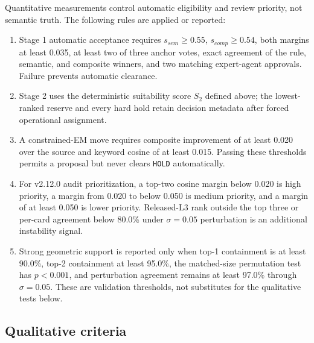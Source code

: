 \documentclass[11pt,a4paper]{article}
\newcommand{\code}[1]{\texttt{#1}}
\begin{document}
Quantitative measurements control automatic eligibility and review priority,
not semantic truth. The following rules are applied or reported:
\begin{enumerate}[leftmargin=2em]
  \item Stage 1 automatic acceptance requires $s_{sem}\geq0.55$,
  $s_{comp}\geq0.54$, both margins at least 0.035, at least two of three anchor
  votes, exact agreement of the rule, semantic, and composite winners, and two
  matching expert-agent approvals. Failure prevents automatic clearance.
  \item Stage 2 uses the deterministic suitability score $S_2$ defined above;
  the lowest-ranked reserve and every hard hold retain decision metadata after
  forced operational assignment.
  \item A constrained-EM move requires composite improvement of at least 0.020
  over the source and keyword cosine of at least 0.015. Passing these thresholds
  permits a proposal but never clears \code{HOLD} automatically.
  \item For v2.12.0 audit prioritization, a top-two cosine margin below 0.020 is
  high priority, a margin from 0.020 to below 0.050 is medium priority, and a
  margin of at least 0.050 is lower priority. Released-L3 rank outside the top
  three or per-card agreement below 80.0\% under $\sigma=0.05$ perturbation is
  an additional instability signal.
  \item Strong geometric support is reported only when top-1 containment is at
  least 90.0\%, top-2 containment at least 95.0\%, the matched-size permutation
  test has $p<0.001$, and perturbation agreement remains at least 97.0\% through
  $\sigma=0.05$. These are validation thresholds, not substitutes for the
  qualitative tests below.
\end{enumerate}

\subsection{Qualitative criteria}
\end{document}

